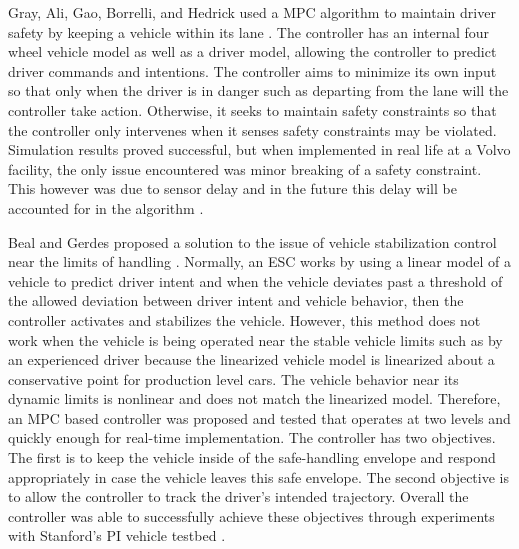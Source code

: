 \documentclass[12pt,onecolumn]{report}
\begin{document}
Gray, Ali, Gao, Borrelli, and Hedrick used a MPC algorithm to maintain driver safety by keeping a vehicle within its lane \cite{Ali&Gray2013}. The controller has an internal four wheel vehicle model as well as a driver model, allowing the controller to predict driver commands and intentions. The controller aims to minimize its own input so that only when the driver is in danger such as departing from the lane will the controller take action. Otherwise, it seeks to maintain safety constraints so that the controller only intervenes when it senses safety constraints may be violated. Simulation results proved successful, but when implemented in real life at a Volvo facility, the only issue encountered was minor breaking of a safety constraint. This however was due to sensor delay and in the future this delay will be accounted for in the algorithm \cite{Ali&Gray2013}.

Beal and Gerdes proposed a solution to the issue of vehicle stabilization control near the limits of handling \cite{Beal&Gerdes2013}. Normally, an ESC works by using a linear model of a vehicle to predict driver intent and when the vehicle deviates past a threshold of the allowed deviation between driver intent and vehicle behavior, then the controller activates and stabilizes the vehicle. However, this method does not work when the vehicle is being operated near the stable vehicle limits such as by an experienced driver because the linearized vehicle model is linearized about a conservative point for production level cars. The vehicle behavior near its dynamic limits is nonlinear and does not match the linearized model. Therefore, an MPC based controller was proposed and tested that operates at two levels and quickly enough for real-time implementation. The controller has two objectives. The first is to keep the vehicle inside of the safe-handling envelope and respond appropriately in case the vehicle leaves this safe envelope. The second objective is to allow the controller to track the driver's intended trajectory. Overall the controller was able to successfully achieve these objectives through experiments with Stanford's PI vehicle testbed \cite{Beal&Gerdes2013}.
\end{document}
